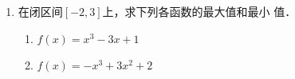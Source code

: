 \begin{enumerate}
\item 在闭区间$[-2,3]$上，求下列各函数的最大值和最小
值．
\begin{multicols}{2}
    \begin{enumerate}
        \item $f(x)=x^3-3x+1$
        \item $f(x)=-x^3+3x^2+2$
    \end{enumerate}
    \end{multicols}
\end{enumerate}